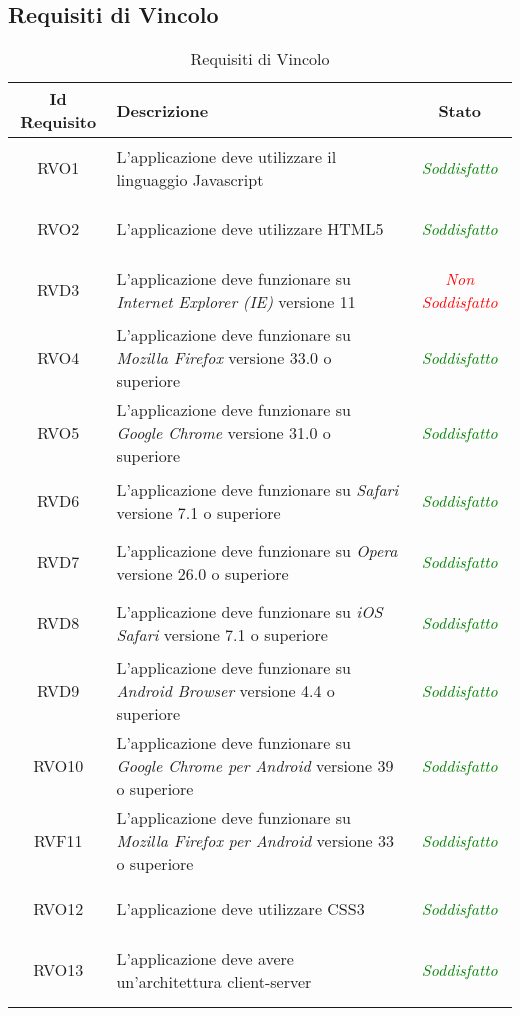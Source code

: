 \subsection{Requisiti di Vincolo}
\normalsize
\begin{longtable}{|c|>{\centering}m{7cm}|c|}
\hline
\textbf{Id Requisito} & \textbf{Descrizione} & \textbf{Stato}\\
\hline
\endhead
\hypertarget{RVO1}{RVO1} & L'applicazione deve utilizzare il linguaggio Javascript & \textcolor{Green}{\textit{Soddisfatto}}\\ \hline
\hypertarget{RVO2}{RVO2} & L'applicazione deve utilizzare HTML5 & \textcolor{Green}{\textit{Soddisfatto}}\\ \hline
\hypertarget{RVD3}{RVD3} & L'applicazione deve funzionare su \textit{Internet Explorer (IE)} versione 11 & \textcolor{Red}{\textit{Non Soddisfatto}}\\ \hline
\hypertarget{RVO4}{RVO4} & L'applicazione deve funzionare su \textit{Mozilla Firefox} versione 33.0 o superiore & \textcolor{Green}{\textit{Soddisfatto}}\\ \hline
\hypertarget{RVO5}{RVO5} & L'applicazione deve funzionare su \textit{Google Chrome} versione 31.0 o superiore & \textcolor{Green}{\textit{Soddisfatto}}\\ \hline
\hypertarget{RVD6}{RVD6} & L'applicazione deve funzionare su \textit{Safari} versione 7.1 o superiore & \textcolor{Green}{\textit{Soddisfatto}}\\ \hline
\hypertarget{RVD7}{RVD7} & L'applicazione deve funzionare su \textit{Opera} versione 26.0 o superiore & \textcolor{Green}{\textit{Soddisfatto}}\\ \hline
\hypertarget{RVD8}{RVD8} & L'applicazione deve funzionare su \textit{iOS Safari} versione 7.1 o superiore & \textcolor{Green}{\textit{Soddisfatto}}\\ \hline
\hypertarget{RVD9}{RVD9} & L'applicazione deve funzionare su \textit{Android Browser} versione 4.4 o superiore & \textcolor{Green}{\textit{Soddisfatto}}\\ \hline
\hypertarget{RVO10}{RVO10} & L'applicazione deve funzionare su \textit{Google Chrome per Android} versione 39 o superiore & \textcolor{Green}{\textit{Soddisfatto}}\\ \hline
\hypertarget{RVF11}{RVF11} & L'applicazione deve funzionare su \textit{Mozilla Firefox per Android} versione 33 o superiore & \textcolor{Green}{\textit{Soddisfatto}}\\ \hline
\hypertarget{RVO12}{RVO12} & L'applicazione deve utilizzare CSS3 & \textcolor{Green}{\textit{Soddisfatto}}\\ \hline
\hypertarget{RVO13}{RVO13} & L'applicazione deve avere un'architettura client-server & \textcolor{Green}{\textit{Soddisfatto}}\\ \hline
\caption[Requisiti di Vincolo]{Requisiti di Vincolo}
\label{tabella:req3}
\end{longtable}
\clearpage
